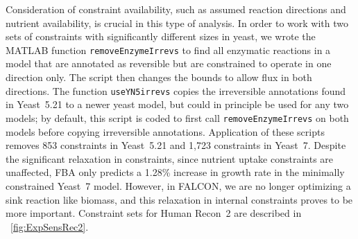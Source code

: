 Consideration of constraint availability, such as assumed reaction
directions and nutrient availability, is crucial in this type of
analysis. In order to work with two sets of constraints with
significantly different sizes in yeast, we
wrote the MATLAB function \texttt{removeEnzymeIrrevs} to find all
enzymatic reactions in a model that are annotated as reversible but
are constrained to operate in one direction only. The script then
changes the bounds to allow flux in both directions. The function
\texttt{useYN5irrevs} copies the irreversible annotations found in
Yeast~5.21 \citep{Lee2012} to a newer yeast model, but could in
principle be used for any two models; by default, this script is coded
to first call \texttt{removeEnzymeIrrevs} on both models before
copying irreversible annotations. Application of these scripts removes
853 constraints in Yeast~5.21 and 1,723 constraints in Yeast~7.
Despite the significant relaxation in constraints, since nutrient
uptake constraints are unaffected, FBA only predicts a 1.28\% increase
in growth rate in the minimally constrained Yeast~7 model. However, in
FALCON, we are no longer optimizing a sink reaction like biomass, and
this relaxation in internal constraints proves to be more important.
Constraint sets for Human Recon~2 are described in \suppOrApp 
\Fig~\ref{fig:ExpSensRec2}.

